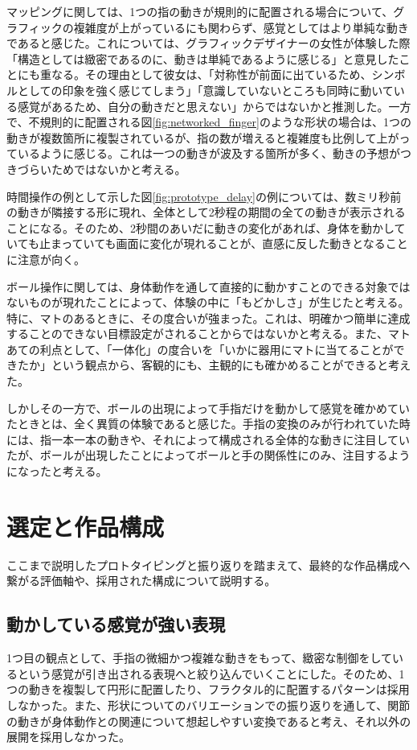 マッピングに関しては、1つの指の動きが規則的に配置される場合について、グラフィックの複雑度が上がっているにも関わらず、感覚としてはより単純な動きであると感じた。これについては、グラフィックデザイナーの女性が体験した際「構造としては緻密であるのに、動きは単純であるように感じる」と意見したことにも重なる。その理由として彼女は、「対称性が前面に出ているため、シンボルとしての印象を強く感じてしまう」「意識していないところも同時に動いている感覚があるため、自分の動きだと思えない」からではないかと推測した。一方で、不規則的に配置される図\ref{fig:networked_finger}のような形状の場合は、1つの動きが複数箇所に複製されているが、指の数が増えると複雑度も比例して上がっているように感じる。これは一つの動きが波及する箇所が多く、動きの予想がつきづらいためではないかと考える。

時間操作の例として示した図\ref{fig:prototype_delay}の例については、数ミリ秒前の動きが隣接する形に現れ、全体として2秒程の期間の全ての動きが表示されることになる。そのため、2秒間のあいだに動きの変化があれば、身体を動かしていても止まっていても画面に変化が現れることが、直感に反した動きとなることに注意が向く。

ボール操作に関しては、身体動作を通して直接的に動かすことのできる対象ではないものが現れたことによって、体験の中に「もどかしさ」が生じたと考える。特に、マトのあるときに、その度合いが強まった。これは、明確かつ簡単に達成することのできない目標設定がされることからではないかと考える。また、マトあての利点として、「一体化」の度合いを「いかに器用にマトに当てることができたか」という観点から、客観的にも、主観的にも確かめることができると考えた。

しかしその一方で、ボールの出現によって手指だけを動かして感覚を確かめていたときとは、全く異質の体験であると感じた。手指の変換のみが行われていた時には、指一本一本の動きや、それによって構成される全体的な動きに注目していたが、ボールが出現したことによってボールと手の関係性にのみ、注目するようになったと考える。

\section{選定と作品構成}
ここまで説明したプロトタイピングと振り返りを踏まえて、最終的な作品構成へ繋がる評価軸や、採用された構成について説明する。
\subsection{動かしている感覚が強い表現}
1つ目の観点として、手指の微細かつ複雑な動きをもって、緻密な制御をしているという感覚が引き出される表現へと絞り込んでいくことにした。そのため、1つの動きを複製して円形に配置したり、フラクタル的に配置するパターンは採用しなかった。また、形状についてのバリエーションでの振り返りを通して、関節の動きが身体動作との関連について想起しやすい変換であると考え、それ以外の展開を採用しなかった。

